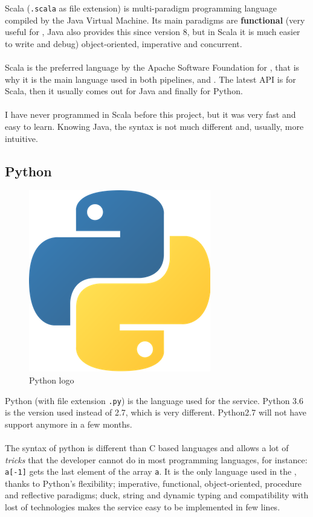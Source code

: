 Scala (\texttt{.scala} as file extension) is multi-paradigm programming language compiled by the Java Virtual Machine\cite{jvm}. Its main paradigms are \textbf{functional} (very useful for , Java\cite{java} also provides this since version 8, but in Scala it is much easier to write and debug) object-oriented, imperative and concurrent.
\\\\
Scala is the preferred language by the Apache Software Foundation for , that is why it is the main language used in both pipelines,  and . The latest  API is for Scala, then it usually comes out for Java and finally for Python.
\\\\
I have never programmed in Scala before this project, but it was very fast and easy to learn. Knowing Java, the syntax is not much different and, usually, more intuitive.

\subsection*{Python\cite{python}}

\begin{figure}[H]
\centering
\includegraphics[scale=0.1]{resources/python-logo.png}
\caption{Python logo}
\end{figure}

Python (with file extension \texttt{.py}) is the language used for the service. Python 3.6 is the version used instead of 2.7, which is very different. Python2.7 will not have support anymore in a few months.
\\\\
The syntax of python is different than C based languages and allows a lot of \textit{tricks} that the developer cannot do in most programming languages, for instance: \texttt{a[-1]} gets the last element of the array \texttt{a}. It is the only language used in the , thanks to Python's flexibility; imperative, functional, object-oriented, procedure and reflective paradigms; duck, string and dynamic typing and compatibility with lost of technologies makes the service easy to be implemented in few lines.

